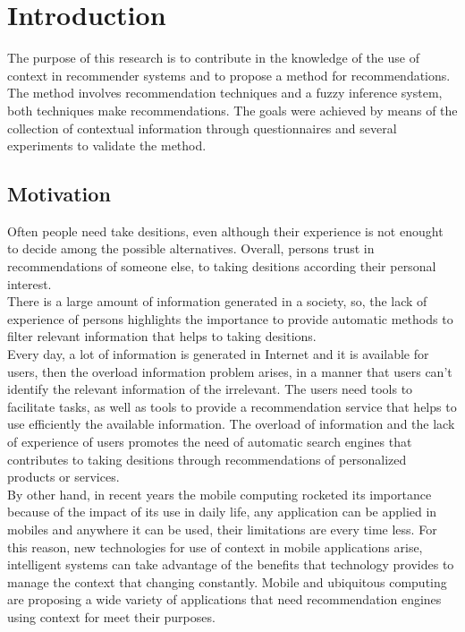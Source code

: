 \chapter{Introduction} \label{introduction} 

The purpose of this research is to contribute in the knowledge of the
use of context in recommender systems and to propose a method for
recommendations. The method involves recommendation techniques and a
fuzzy inference system, both techniques make recommendations. The
goals were achieved by means of the collection of contextual
information through questionnaires and several experiments 
to validate the method.

\section{Motivation}

Often people need take desitions, even although their experience is
not enought to decide among the possible alternatives. Overall,
persons trust in recommendations of someone else, to taking desitions
according their personal interest.\\
There is a large amount of information generated in a society, so, the
lack of experience of persons highlights the importance to provide
automatic methods to filter relevant information that helps to taking
desitions. \\Every day, a lot of information is generated in Internet
and it is available for users, then the overload information problem
arises, in a manner that users can't identify the relevant information
of the irrelevant. The users need tools to facilitate tasks, as well
as tools to provide a recommendation service that helps to use
efficiently the available information. The overload of information and
the lack of experience of users promotes the need of automatic search
engines that contributes to taking desitions through recommendations
of personalized products or services. \\ By other hand, in recent
years the mobile computing rocketed its importance because of the
impact of its use in daily life, any application can be applied in
mobiles and anywhere it can be used, their limitations are every time
less. For this reason, new technologies for use of context in mobile
applications arise, intelligent systems can take advantage of the
benefits that technology provides to manage the context that changing
constantly. Mobile and ubiquitous computing\cite{noguera2012mobile}
\cite{chiou2010adaptive} are proposing a wide variety of applications
that need recommendation engines using context for meet their
purposes.

